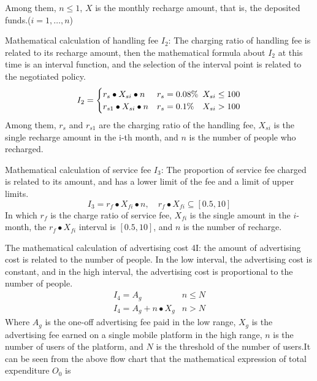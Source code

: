\documentclass[../mcmpaper]{subfiles}
\begin{document}
Among them, $n\leq 1$, $X$ is the monthly recharge amount, that is, the deposited funds.($i=1,\dots,n$)
\par
Mathematical calculation of handling fee $I_2$: The charging ratio of handling fee is related to its recharge amount, then the mathematical formula about $I_2$ at this time is an interval function, and the selection of the interval point is related to the negotiated policy.
\begin{equation}
I_{2}= \begin{cases}r_{s} \bullet X_{s i} \bullet n & r_{s}=0.08\%\hspace{0.5
  em} X_{s i} \leq 100 \\ r_{s 1} \bullet X_{s i} \bullet n & r_{s}=0.1\% \quad X_{s i}>100\end{cases}
\end{equation}
Among them, $r_s$ and $r_{s1}$ are the charging ratio of the handling fee, $X_{si}$ is the single recharge amount in the i-th month, and $n$ is the number of people who recharged.
\par
Mathematical calculation of service fee $I_3$: The proportion of service fee charged is related to its amount, and has a lower limit of the fee and a limit of upper limits.
\begin{equation}
I_{3}=r_{f} \bullet X_{f i} \bullet n, \quad r_{f} \bullet X_{f i} \subseteq[0.5,10]
\end{equation}
In which $r_f$ is the charge ratio of service fee, $X_{fi}$ is the single amount in the $i$-month, the $r_f\bullet X_{fi}$ interval is $[0.5, 10]$, and $n$ is the number of recharge.
\par
The mathematical calculation of advertising cost 4I: the amount of advertising cost is related to the number of people. In the low interval, the advertising cost is constant, and in the high interval, the advertising cost is proportional to the number of people.
\begin{equation}
\begin{array}{ll}
I_{4}=A_{g} & n \leq N \\
I_{4}=A_{g}+n \bullet X_{g} & n>N
\end{array}
\end{equation}
Where $A_g$ is the one-off advertising fee paid in the low range, $X_g$ is the advertising fee earned on a single mobile platform in the high range, $n$ is the number of users of the platform, and $N$ is the threshold of the number of users.It can be seen from the above flow chart that the mathematical expression of total expenditure $O_0$ is
\end{document}
